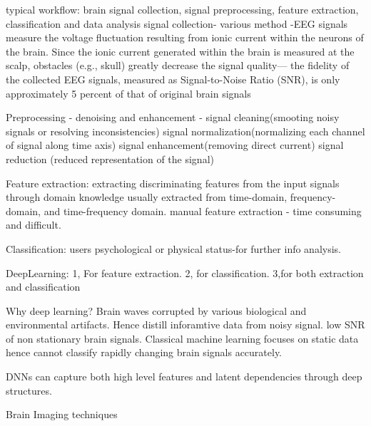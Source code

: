 \cite{Survey_DL_BCI_2020}
typical workflow: brain signal collection, signal preprocessing, feature extraction, classification and data analysis
signal collection- various method -EEG signals measure the voltage fluctuation resulting from ionic current within the neurons of the brain.
Since the ionic current generated within the brain is measured at the scalp, obstacles (e.g., skull) greatly decrease the signal quality—
the fidelity of the collected EEG signals, measured as Signal-to-Noise Ratio (SNR), is only approximately 5 percent of that of original brain signals

Preprocessing - denoising and enhancement - signal cleaning(smooting noisy signals or resolving inconsistencies)
signal normalization(normalizing each channel of signal along time axis)
signal enhancement(removing direct current)
signal reduction (reduced representation of the signal)

Feature extraction: extracting discriminating features from the input signals through domain knowledge
usually extracted from time-domain, frequency-domain, and time-frequency domain.
manual feature extraction - time consuming and difficult.

Classification: users psychological or physical status-for further info analysis.

DeepLearning: 1, For feature extraction. 2, for classification. 3,for both extraction and classification

Why deep learning?
Brain waves corrupted by various biological and environmental artifacts. Hence distill inforamtive data from noisy signal.
low SNR of non stationary brain signals. Classical machine learning focuses on static data  hence cannot classify rapidly changing brain signals accurately.

DNNs can capture both high level features and latent dependencies through deep structures.

Brain Imaging techniques


